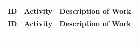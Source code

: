 \documentclass[10pt,letterpaper]{article}
\renewcommand\arraystretch{1.25}
\begin{document}
\begin{center}
\begingroup
\setlength\tabcolsep{2.0pt}
\footnotesize
\renewcommand\arraystretch{1.55}
\begin{longtable}{|>{\raggedright\arraybackslash}p{2.120in}|>{\raggedright\arraybackslash}p{2.120in}|>{\raggedright\arraybackslash}p{2.120in}|}
\hline
\rowcolor{light}
\textbf{ID} & \textbf{Activity} & \textbf{Description of Work} \\ \hline
\endfirsthead
\hline\rowcolor{light} \textbf{ID} & \textbf{Activity} & \textbf{Description of Work} \\ \hline
\endhead
\rule{0pt}{11pt}\hspace{0pt} & \rule{0pt}{11pt}\hspace{0pt} & \rule{0pt}{11pt}\hspace{0pt} \\ \hline
\rule{0pt}{11pt}\hspace{0pt} & \rule{0pt}{11pt}\hspace{0pt} & \rule{0pt}{11pt}\hspace{0pt} \\ \hline
\rule{0pt}{11pt}\hspace{0pt} & \rule{0pt}{11pt}\hspace{0pt} & \rule{0pt}{11pt}\hspace{0pt} \\ \hline
\rule{0pt}{11pt}\hspace{0pt} & \rule{0pt}{11pt}\hspace{0pt} & \rule{0pt}{11pt}\hspace{0pt} \\ \hline
\rule{0pt}{11pt}\hspace{0pt} & \rule{0pt}{11pt}\hspace{0pt} & \rule{0pt}{11pt}\hspace{0pt} \\ \hline
\end{longtable}
\endgroup
\end{center}
\end{document}
